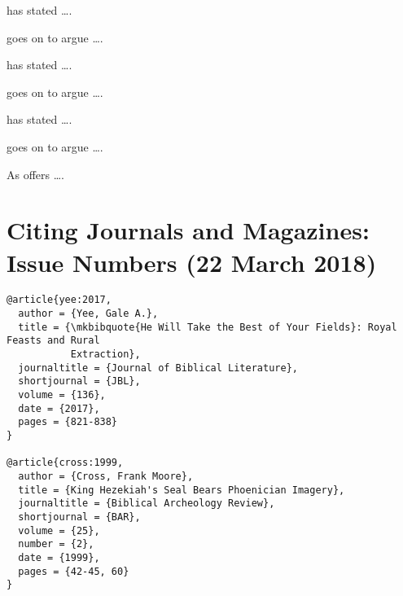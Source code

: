 \documentclass[a4paper]{article}
\begin{document}
\begin{verbcite}
  \citeauthor{eilberg-schwartz:1991} has stated ….
\end{verbcite}
\begin{verbcite}
  \citeauthor{eilberg-schwartz:1991} goes on to argue ….
\end{verbcite}
\begin{verbcite}
  \citeauthor{schusslerfiorenza:1986} has stated ….
\end{verbcite}
\begin{verbcite}
  \citeauthor{schusslerfiorenza:1986} goes on to argue ….
\end{verbcite}
\begin{verbcite}
  \citeauthor{trebollebarrera:2013} has stated ….
\end{verbcite}
\begin{verbcite}
  \citeauthor{trebollebarrera:2013} goes on to argue ….
\end{verbcite}
\begin{verbcite}
  As \citeauthor{hooks:1990} offers ….
\end{verbcite}
\begin{verbcite}
  \nocite{logan+wedderburn:1983, barbour:2012, grillo:2017, barbour:seealso,
    grillo:seealso}
\end{verbcite}
\exampleabbreviations
\examplebibliography
{}

\section{Citing Journals and Magazines: Issue Numbers (22 March 2018)}

\begin{verbatim}
@article{yee:2017,
  author = {Yee, Gale A.},
  title = {\mkbibquote{He Will Take the Best of Your Fields}: Royal Feasts and Rural
           Extraction},
  journaltitle = {Journal of Biblical Literature},
  shortjournal = {JBL},
  volume = {136},
  date = {2017},
  pages = {821-838}
}

@article{cross:1999,
  author = {Cross, Frank Moore},
  title = {King Hezekiah's Seal Bears Phoenician Imagery},
  journaltitle = {Biblical Archeology Review},
  shortjournal = {BAR},
  volume = {25},
  number = {2},
  date = {1999},
  pages = {42-45, 60}
}
\end{verbatim}
\end{document}
